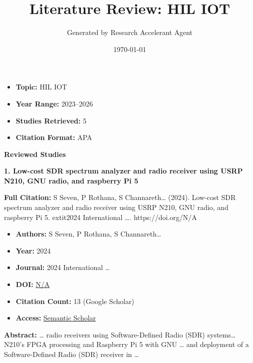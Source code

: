 \documentclass[11pt,a4paper]{article}
\title{\textbf{Literature Review: HIL IOT}}
\author{Generated by Research Accelerant Agent}
\date{\today}
\begin{document}
\maketitle



\begin{resultbox}
\begin{itemize}[leftmargin=*]
    \item \textbf{Topic:} HIL IOT
    \item \textbf{Year Range:} 2023--2026
    \item \textbf{Studies Retrieved:} 5
    \item \textbf{Citation Format:} APA
\end{itemize}
\end{resultbox}

\vspace{1em}

\textbf{\large Reviewed Studies}\par\vspace{0.5em}


\textbf{1. Low-cost SDR spectrum analyzer and radio receiver using USRP N210, GNU radio, and raspberry Pi 5}

\textbf{Full Citation:} S Seven, P Rothana, S Channareth… (2024). Low-cost SDR spectrum analyzer and radio receiver using USRP N210, GNU radio, and raspberry Pi 5. 	extit{2024 International …}. https://doi.org/N/A

\begin{resultbox}
\begin{itemize}[leftmargin=*]
    \item \textbf{Authors:} S Seven, P Rothana, S Channareth…
    \item \textbf{Year:} 2024
    \item \textbf{Journal:} 2024 International …
    
    
    
    \item \textbf{DOI:} \href{https://doi.org/}{N/A}
    \item \textbf{Citation Count:} 13 (Google Scholar)
    \item \textbf{Access:} \href{https://ieeexplore.ieee.org/abstract/document/10791167/}{Semantic Scholar}
\end{itemize}
\end{resultbox}

\textbf{Abstract:} … radio receivers using Software-Defined Radio (SDR) systems… N210's FPGA processing and Raspberry Pi 5 with GNU … and deployment of a Software-Defined Radio (SDR) receiver in …\par\vspace{0.5em}
\end{document}
